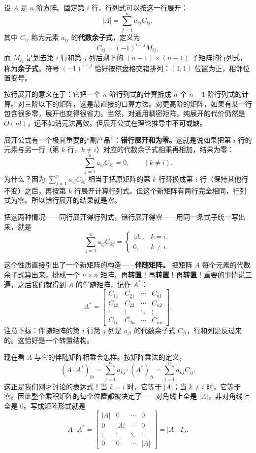 \documentclass[UTF8]{ctexbook}
\begin{document}
设 $A$ 是 $n$ 阶方阵。固定第 $i$ 行，行列式可以按这一行展开：
\[
|A|=\sum_{j=1}^{n} a_{ij}C_{ij},
\]
其中 $C_{ij}$ 称为元素 $a_{ij}$ 的\textbf{代数余子式}，定义为
\[
C_{ij}=(-1)^{i+j}M_{ij},
\]
而 $M_{ij}$ 是划去第 $i$ 行和第 $j$ 列后剩下的 $(n-1)\times(n-1)$ 子矩阵的行列式，称为\textbf{余子式}。符号 $(-1)^{i+j}$ 恰好按棋盘格交错排列：$(1,1)$ 位置为正，相邻位置变号。

按行展开的意义在于：它把一个 $n$ 阶行列式的计算拆成 $n$ 个 $n-1$ 阶行列式的计算。对三阶以下的矩阵，这是最直接的口算方法。对更高阶的矩阵，如果有某一行包含很多零，展开也变得很省力。当然，对通用稠密矩阵，纯展开的代价仍然是 $O(n!)$，远不如消元法高效。但展开公式在理论推导中不可或缺。

展开公式有一个极其重要的“副产品”：\textbf{错行展开和为零。}这就是说如果把第 $i$ 行的元素与另一行（第 $k$ 行，$k\neq i$）对应的代数余子式相乘再相加，结果为零：
\[
\sum_{j=1}^{n} a_{ij}C_{kj}=0,\qquad (k\neq i).
\]
为什么？因为 $\sum_{j=1}^{n} a_{ij}C_{kj}$ 相当于把原矩阵的第 $k$ 行替换成第 $i$ 行（保持其他行不变）之后，再按第 $k$ 行展开计算行列式。但这个新矩阵有两行完全相同，行列式为零。所以错行展开的结果就是零。

把这两种情况——同行展开得行列式，错行展开得零——用同一条式子统一写出来，就是
\[
\sum_{j=1}^{n} a_{ij}C_{kj}=
\begin{cases}
|A|, & k=i,\\[4pt]
0, & k\neq i.
\end{cases}
\]

这个性质直接引出了一个新矩阵的构造——\textbf{伴随矩阵。}
把矩阵 $A$ 每个元素的代数余子式算出来，排成一个 $n\times n$ 矩阵，再\textbf{转置}！再\textbf{转置}！再\textbf{转置}！重要的事情说三遍，之后我们就得到 $A$ 的伴随矩阵，记作 $A^*$：
\[
A^*=\begin{bmatrix}
C_{11} & C_{21} & \cdots & C_{n1}\\
C_{12} & C_{22} & \cdots & C_{n2}\\
\vdots & \vdots & \ddots & \vdots\\
C_{1n} & C_{2n} & \cdots & C_{nn}
\end{bmatrix}.
\]
注意下标：伴随矩阵的第 $i$ 行第 $j$ 列是 $a_{ji}$ 的代数余子式 $C_{ji}$，行和列是反过来的。这恰好是一个转置结构。

现在看 $A$ 与它的伴随矩阵相乘会怎样。按矩阵乘法的定义，
\[
(A\cdot A^*)_{ki}=\sum_{j=1}^{n} a_{kj}\cdot (A^*)_{ji}
=\sum_{j=1}^{n} a_{kj}C_{ij}.
\]
这正是我们刚才讨论的表达式！当 $k=i$ 时，它等于 $|A|$；当 $k\neq i$ 时，它等于零。因此整个乘积矩阵的每个位置都被决定了——对角线上全是 $|A|$，非对角线上全是 $0$。写成矩阵形式就是
\[
A \cdot A^* =
\begin{bmatrix}
|A| & 0 & \cdots & 0 \\
0 & |A| & \cdots & 0 \\
\vdots & \vdots & \ddots & \vdots \\
0 & 0 & \cdots & |A|
\end{bmatrix}
= |A| \cdot I_n.
\]
\end{document}
